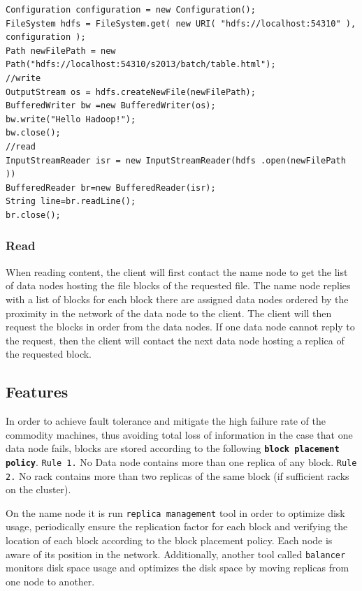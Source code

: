 \documentclass{sig-alternate}
\begin{document}
\begin{lstlisting}[basicstyle=\footnotesize\tt, frame=single, float=*, label={lst:hdfs-write},caption=HDFS Write and Read]
Configuration configuration = new Configuration();
FileSystem hdfs = FileSystem.get( new URI( "hdfs://localhost:54310" ), configuration );
Path newFilePath = new Path("hdfs://localhost:54310/s2013/batch/table.html");
//write
OutputStream os = hdfs.createNewFile(newFilePath);
BufferedWriter bw =new BufferedWriter(os);
bw.write("Hello Hadoop!");
bw.close();
//read
InputStreamReader isr = new InputStreamReader(hdfs .open(newFilePath ))
BufferedReader br=new BufferedReader(isr); 
String line=br.readLine();
br.close();
\end{lstlisting}

\subsubsection{Read}
When reading content, the client will first contact the name node to get the list of data nodes hosting the file blocks of the requested file. The name node replies with a list of blocks for each block there are assigned data nodes ordered by the proximity in the network of the data node to the client. 
The client will then request the blocks in order from the data nodes. If one data node cannot reply to the request, then the client will contact the next data node hosting a replica of the requested block.

\subsection{Features}
In order to achieve fault tolerance and mitigate the high failure rate of the commodity machines, thus avoiding total loss of information in the case that one data node fails, blocks are stored according to the following \textbf{\texttt{block placement policy}}.
\texttt{Rule 1.} No Data node contains more than one replica of any block. \texttt{Rule 2.} No rack contains more than two replicas of the same block (if sufficient racks on the cluster).

On the name node it is run \texttt{replica management} tool in order to optimize disk usage, periodically ensure the replication factor for each block and verifying the location of each block according to the block placement policy. Each node is aware of its position in the network.
Additionally, another tool called \texttt{balancer} monitors disk space usage and optimizes the disk space by moving replicas from one node to another.
\end{document}
